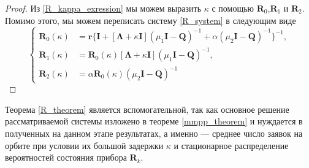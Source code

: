 \begin{proof}
Из \eqref{R_kappa_exression} мы можем выразить $\kappa$ с помощью $\boldsymbol{R}_{0}$,$\boldsymbol{R}_{1}$ и $\boldsymbol{R}_{2}$. Помимо этого, мы можем переписать систему \eqref{R_system} в следующим виде
\begin{equation*}
	\left\{
	\begin{aligned}
		\boldsymbol{R}_{0}(\kappa) & = \boldsymbol{r}\{\boldsymbol{I} + [\boldsymbol{\Lambda} + \kappa\boldsymbol{I}](\mu_{1}\boldsymbol{I}-\boldsymbol{Q})^{-1}+\alpha(\mu_{2}\boldsymbol{I}-\boldsymbol{Q})^{-1}\}^{-1},\\
		\boldsymbol{R}_{1}(\kappa) & = \boldsymbol{R}_{0}(\kappa)[\boldsymbol{\Lambda} + \kappa\boldsymbol{I}](\mu_{1}\boldsymbol{I} - \boldsymbol{Q})^{-1},\\
		\boldsymbol{R}_{2}(\kappa) & = \alpha\boldsymbol{R}_{0}(\kappa)(\mu_{2}\boldsymbol{I} - \boldsymbol{Q})^{-1}
	\end{aligned}
	\right.
\end{equation*}
\end{proof}
Теорема \ref{R_theorem} является вспомогательной, так как основное решение рассматриваемой системы изложено в теореме \ref{mmpp_theorem} и нуждается в полученных на данном этапе результатах, а именно --- среднее число заявок на орбите при условии их большой задержки $\kappa$ и стационарное распределение вероятностей состояния прибора $\boldsymbol{R}_{k}$.

